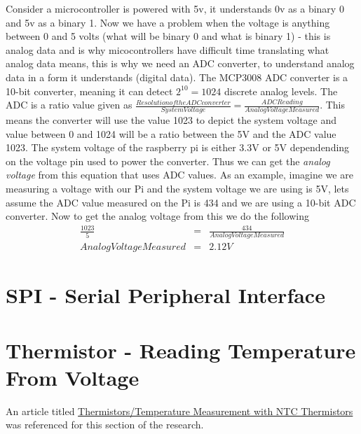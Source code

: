 \documentclass{article}
\begin{document}
	Consider a microcontroller is powered with 5v, it understands 0v as a binary 0 and 5v as a binary 1. Now we have a problem when the voltage is anything between 0 and 5 volts (what will be binary 0 and what is binary 1) - this is analog data and is why micocontrollers have difficult time translating what analog data means, this is why we need an ADC converter, to understand analog data in a form it understands (digital data). The MCP3008 ADC converter is a 10-bit converter, meaning it can detect $2^{10} = 1024$ discrete analog levels. The ADC is a ratio value given as $\frac{Resolution of the ADC converter}{System Voltage} = \frac{ADC Reading}{Analog Voltage Measured}$. This means the converter will use the value 1023 to depict the system voltage and value between 0 and 1024 will be a ratio between the 5V and the ADC value 1023. The system voltage of the raspberry pi is either 3.3V or 5V dependending on the voltage pin used to power the converter. Thus we can get the \textit{analog voltage} from this equation that uses ADC values. As an example, imagine we are measuring a voltage with our Pi and the system voltage we are using is 5V, lets assume the ADC value measured on the Pi is 434 and we are using a 10-bit ADC converter. Now to get the analog voltage from this we do the following
	\begin{equation}
		\begin{array}{ccc}
			\frac{1023}{5} & = & \frac{434}{Analog Voltage Measured}\\
	 		Analog Voltage Measured & = & 2.12V
		\end{array}
	 \end{equation} 
	

	\section{SPI - Serial Peripheral Interface} %
	\label{sec:spi_serial_peripheral_interface}

	

	\section{Thermistor - Reading Temperature From Voltage} %
	\label{sec:thermistor_reading_temperature_from_voltage}
	An article titled \href{https://www.jameco.com/Jameco/workshop/techtip/temperature-measurement-ntc-thermistors.html#:~:text=Thermistor%20Response%20to%20Temperature,in%20response%20to%20temperature%20change.}{Thermistors/Temperature Measurement with NTC Thermistors} was referenced for this section of the research.
	
\end{document}
